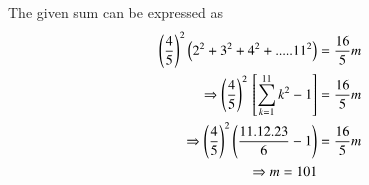 The given sum can be expressed as
\begin{align}
\left (\frac{4}{5} \right)^{2}\left( 2^{2} + 3^{2} + 4^{2} +.....11^{2} \right) &= \frac{16}{5}m \\
\Rightarrow \left(\frac{4}{5}\right)^2{}\left[\sum_{k = 1}^{11}k^2-1\right] &= \frac{16}{5}m \\
\Rightarrow \left(\frac{4}{5}\right)^2\left(\frac{11.12.23}{6} - 1\right) &= \frac{16}{5}m \\
\Rightarrow m = 101
\end{align}

